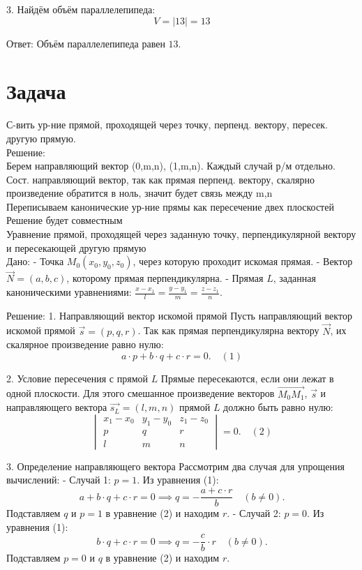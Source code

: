 \documentclass[a4paper,14pt]{extreport} %
\begin{document}
3.  Найдём объём параллелепипеда: 
\[
V = |13| = 13
\]

 Ответ:  Объём параллелепипеда равен \(\boxed{13}\).
\section*{Задача}
С-вить ур-ние прямой, проходящей через точку, перпенд. вектору, пересек. другую прямую. \\
Решение:\\
Берем направляющий вектор (0,m,n), (1,m,n). Каждый случай р/м отдельно. \\
Сост. направляющий вектор, так как прямая перпенд. вектору, скалярно произведение обратится в ноль, значит будет связь между m,n \\
Переписываем канонические ур-ние прямы как пересечение двех плоскостей\\
Решение будет совместным \\
 Уравнение прямой, проходящей через заданную точку, перпендикулярной вектору и пересекающей другую прямую \\

 Дано: 
- Точка \( M_0(x_0, y_0, z_0) \), через которую проходит искомая прямая.
- Вектор \( \vec{N} = (a, b, c) \), которому прямая перпендикулярна.
- Прямая \( L \), заданная каноническими уравнениями:  
  \( \frac{x - x_1}{l} = \frac{y - y_1}{m} = \frac{z - z_1}{n} \).

 Решение: 
1.  Направляющий вектор искомой прямой   
   Пусть направляющий вектор искомой прямой \( \vec{s} = (p, q, r) \). Так как прямая перпендикулярна вектору \( \vec{N} \), их скалярное произведение равно нулю:  
   \[
   a \cdot p + b \cdot q + c \cdot r = 0. \quad (1)
   \]

2.  Условие пересечения с прямой \( L \)   
   Прямые пересекаются, если они лежат в одной плоскости. Для этого смешанное произведение векторов \( \overrightarrow{M_0M_1} \), \( \vec{s} \) и направляющего вектора \( \vec{s_L} = (l, m, n) \) прямой \( L \) должно быть равно нулю:  
   \[
   \begin{vmatrix}
   x_1 - x_0 & y_1 - y_0 & z_1 - z_0 \\
   p & q & r \\
   l & m & n
   \end{vmatrix} = 0. \quad (2)
   \]

3.  Определение направляющего вектора   
   Рассмотрим два случая для упрощения вычислений:  
   -  Случай 1:  \( p = 1 \).  
     Из уравнения (1):  
     \[
     a + b \cdot q + c \cdot r = 0 \implies q = -\frac{a + c \cdot r}{b} \quad (b \neq 0).
     \]  
     Подставляем \( q \) и \( p = 1 \) в уравнение (2) и находим \( r \).  
   -  Случай 2:  \( p = 0 \).  
     Из уравнения (1):  
     \[
     b \cdot q + c \cdot r = 0 \implies q = -\frac{c}{b} \cdot r \quad (b \neq 0).
     \]  
     Подставляем \( p = 0 \) и \( q \) в уравнение (2) и находим \( r \).
\end{document}
